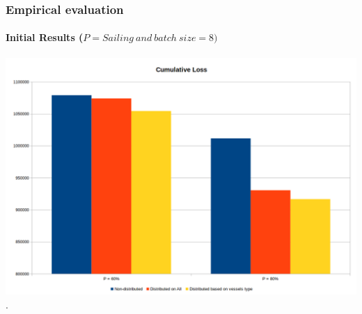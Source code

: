 \begin{frame}
	
	\frametitle{Empirical evaluation }
	\framesubtitle{Initial  Results ($\mathit{P=Sailing}\ and\ batch\ size= 8)$}
	
	\begin{center}
		\includegraphics[width=1.05\textwidth,left]{figures/loss.png}\\
		.
	\end{center}
	
\end{frame}
